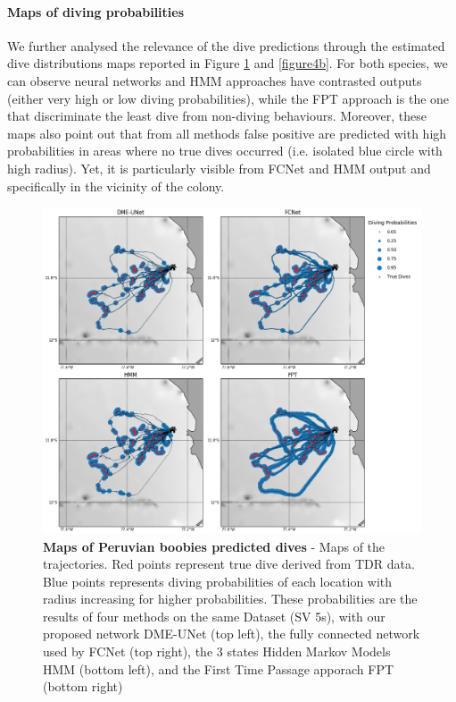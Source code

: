 \documentclass{article}
\begin{document}
\paragraph{Maps of diving probabilities}
We further analysed the relevance of the dive predictions through the estimated dive distributions maps reported in Figure \ref{figure4a} and \ref{figure4b}. For both species, we can observe neural networks and HMM approaches have contrasted outputs (either very high or low diving probabilities), while the FPT approach is the one that discriminate the least dive from non-diving behaviours. Moreover, these maps also point out that from all methods false positive are predicted with high probabilities in areas where no true dives occurred (i.e. isolated blue circle with high radius). Yet, it is particularly visible from FCNet and HMM output and specifically in the vicinity of the colony.

\newpage

\begin{figure}[!h]
  \centering
  \includegraphics[scale=0.5]{figure4a.png}
  \caption{\textbf{Maps of Peruvian boobies predicted dives} - Maps of the trajectories. Red points represent true dive derived from TDR data. Blue points represents diving probabilities of each location with radius increasing for higher probabilities. These probabilities are the results of four methods on the same Dataset (SV 5s), with our proposed network DME-UNet (top left), the fully connected network used by \cite{browning_predicting_2018}  FCNet (top right), the 3 states Hidden Markov Models HMM (bottom left), and the First Time Passage apporach FPT (bottom right)}
  \label{figure4a}
\end{figure}
\end{document}
